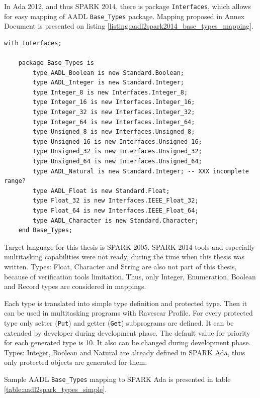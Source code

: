 \doublespacing

In Ada 2012, and thus SPARK 2014, there is package \lstinline{Interfaces}, which allows for easy mapping of AADL \lstinline{Base_Types} package. Mapping proposed in Annex Document \cite{AnnexDoc} is presented on listing \ref{listing:aadl2spark2014_base_types_mapping}.

\singlespacing
\begin{lstlisting}[language=aadl, frame=single, gobble=0, caption={Mapping of Base\_Types for SPARK 2014}, label={listing:aadl2spark2014_base_types_mapping}]
	with Interfaces;

	package Base_Types is
		type AADL_Boolean is new Standard.Boolean;
		type AADL_Integer is new Standard.Integer;
	 	type Integer_8 is new Interfaces.Integer_8;
	 	type Integer_16 is new Interfaces.Integer_16;
		type Integer_32 is new Interfaces.Integer_32;
		type Integer_64 is new Interfaces.Integer_64;
		type Unsigned_8 is new Interfaces.Unsigned_8;
		type Unsigned_16 is new Interfaces.Unsigned_16;
		type Unsigned_32 is new Interfaces.Unsigned_32;
		type Unsigned_64 is new Interfaces.Unsigned_64;
		type AADL_Natural is new Standard.Integer; -- XXX incomplete range? 
		type AADL_Float is new Standard.Float;
		type Float_32 is new Interfaces.IEEE_Float_32;
		type Float_64 is new Interfaces.IEEE_Float_64;
	  	type AADL_Character is new Standard.Character;
	end Base_Types;

\end{lstlisting} 
\doublespacing

Target language for this thesis is SPARK 2005. SPARK 2014 tools and especially multitasking capabilities were not ready, during the time when this thesis was written. Types: Float, Character and String are also not part of this thesis, because of verification tools limitation. Thus, only Integer, Enumeration, Boolean and Record types are considered in mappings.

Each type is translated into simple type definition and protected type. Then it can be used in multitasking programs with Ravescar Profile. For every protected type only setter (\lstinline{Put}) and getter (\lstinline{Get}) subprograms are defined. It can be extended by developer during development phase. The default value for priority for each generated type is 10. It also can be changed during development phase. Types: Integer, Boolean and Natural are already defined in SPARK Ada, thus only protected objects are generated for them.

Sample AADL \lstinline{Base_Types} mapping to SPARK Ada is presented in table \ref{table:aadl2spark_types_simple}.

